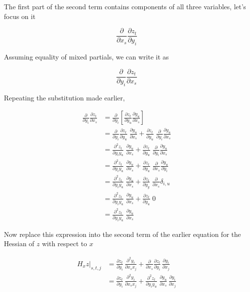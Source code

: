 \documentclass[11pt]{amsart}
\begin{document}
The first part of the second term contains components of all three variables, let's focus on it

$$
\frac{\partial}{\partial x_{s}}
\frac{\partial z_{t}}{\partial y_{i}}
$$

Assuming equality of mixed partials, we can write it as

$$
\frac{\partial}{\partial y_{i} }
\frac{\partial z_{t}}{\partial x_{s}}
$$

Repeating the substitution made earlier,

$$
\begin{aligned}
\frac{\partial}{\partial y_{i} }
\frac{\partial z_{t}}{\partial x_{s}}
&=
\frac{\partial}{\partial y_{i} }
\left[
\frac{\partial z_{t}}{\partial y_{u}}
\frac{\partial y_{u}}{\partial x_{s}}
\right]
\\
&=
\frac{\partial}{\partial y_{i} }
\frac{\partial z_{t}}{\partial y_{u}}
\;
\frac{\partial y_{u}}{\partial x_{s}}
+
\frac{\partial z_{t}}{\partial y_{u}}
\;
\frac{\partial}{\partial y_{i} }
\frac{\partial y_{u}}{\partial x_{s}}
\\
&= 
\frac{\partial^{2} z_{t}}{\partial y_{i} y_{u}}
\;
\frac{\partial y_{u}}{\partial x_{s}}
+
\frac{\partial z_{t}}{\partial y_{u}}
\;
\frac{\partial}{\partial y_{i} }
\frac{\partial y_{u}}{\partial x_{s}}
\\
&= 
\frac{\partial^{2} z_{t}}{\partial y_{i} y_{u}}
\;
\frac{\partial y_{u}}{\partial x_{s}}
+
\frac{\partial z_{t}}{\partial y_{u}}
\;
\frac{\partial}{\partial x_{s} }
\frac{\partial y_{u}}{\partial y_{i} }
\\
&= 
\frac{\partial^{2} z_{t}}{\partial y_{i} y_{u}}
\;
\frac{\partial y_{u}}{\partial x_{s}}
+
\frac{\partial z_{t}}{\partial y_{y}}
\;
\frac{\partial}{\partial x_{s} }
\delta_{i,u}
\\
&=
\frac{\partial^{2} z_{t}}{\partial y_{i} y_{u}}
\;
\frac{\partial y_{u}}{\partial x_{s}}
+
\frac{\partial z_{t}}{\partial y_{u}}
\;
0
\\
&=
\frac{\partial^{2} z_{t}}{\partial y_{i} y_{u}}
\;
\frac{\partial y_{u}}{\partial x_{s}}
\end{aligned}
$$

Now replace this expression into the second term of the earlier equation for the Hessian of $z$ with respect to $x$

$$
\begin{aligned}
\left.
H_{x} z \right\vert_{s,t,j} 
&= 
\frac{\partial z_{t}}{\partial y_{i}}
\,
\frac{\partial^{2} y_{i}}{\partial x_{s} x_{j}}
+
\frac{\partial}{\partial x_{s}}
\frac{\partial z_{t}}{\partial y_{i}}
\,
\frac{\partial y_{i}}{\partial x_{j}}
\\
&= 
\frac{\partial z_{t}}{\partial y_{i}}
\,
\frac{\partial^{2} y_{i}}{\partial x_{s} x_{j}}
+
\frac{\partial^{2} z_{t}}{\partial y_{i} y_{u}}
\;
\frac{\partial y_{u}}{\partial x_{s}}
\,
\frac{\partial y_{i}}{\partial x_{j}}
\end{aligned}
$$
\end{document}
